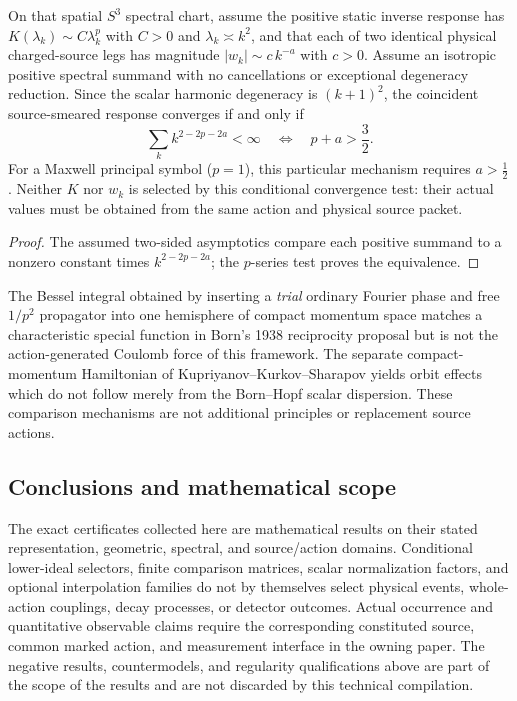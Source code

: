 \documentclass[11pt,a4paper]{article}
\begin{document}
\begin{corollary}
\label{p3g:cor:v340-s3lit-uv-criterion}
On that spatial $S^3$ spectral chart, assume the positive static
inverse response has $K(\lambda_k)\sim C\lambda_k^p$ with $C>0$
and $\lambda_k\asymp k^2$, and that each of two identical physical
charged-source legs has magnitude $|w_k|\sim c\,k^{-a}$ with $c>0$.
Assume an isotropic positive spectral summand with no cancellations
or exceptional degeneracy reduction.  Since the scalar harmonic
degeneracy is $(k+1)^2$, the coincident source-smeared response
converges if and only if
\[
 \sum_k k^{2-2p-2a}<\infty
 \quad\Longleftrightarrow\quad p+a>\frac32.
\]
For a Maxwell principal symbol ($p=1$), this particular mechanism
requires $a>\tfrac12$.  Neither $K$ nor $w_k$ is selected by this
conditional convergence test: their actual values must be obtained
from the same action and physical source packet.
\end{corollary}
\begin{proof}
The assumed two-sided asymptotics compare each positive summand
to a nonzero constant times $k^{2-2p-2a}$; the $p$-series test
proves the equivalence.
\end{proof}

\begin{remark}
\label{p3g:rem:v340-s3lit-literature-firewall}
The Bessel integral obtained by inserting a \emph{trial} ordinary
Fourier phase and free $1/p^2$ propagator into one hemisphere of
compact momentum space matches a characteristic special function
in Born's 1938 reciprocity proposal but is not the action-generated
Coulomb force of this framework.  The separate compact-momentum
Hamiltonian of Kupriyanov--Kurkov--Sharapov yields orbit effects
which do not follow merely from the Born--Hopf scalar dispersion.
These comparison mechanisms are not additional principles or
replacement source actions.
\end{remark}


\subsection{Conclusions and mathematical scope}
The exact certificates collected here are mathematical results on their stated
representation, geometric, spectral, and source/action domains. Conditional
lower-ideal selectors, finite comparison matrices, scalar normalization factors,
and optional interpolation families do not by themselves select physical events,
whole-action couplings, decay processes, or detector outcomes. Actual occurrence
and quantitative observable claims require the corresponding constituted source,
common marked action, and measurement interface in the owning paper. The
negative results, countermodels, and regularity qualifications above are part
of the scope of the results and are not discarded by this technical compilation.

\printbibliography
\end{document}
